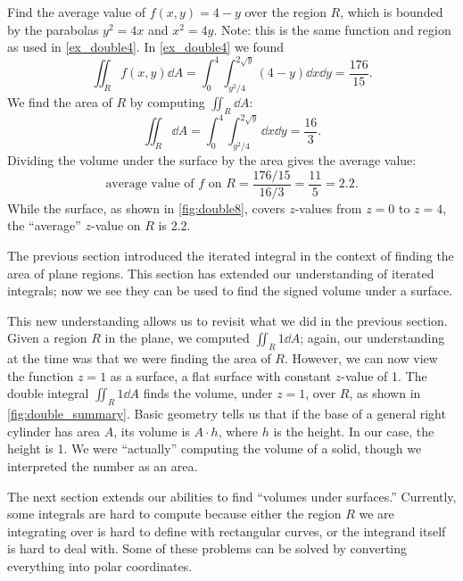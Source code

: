 \begin{example}\label{ex_double8}
Find the average value of $f(x,y) = 4-y$ over the region $R$, which is bounded by the parabolas $y^2=4x$ and $x^2=4y$. Note: this is the same function and region as used in \autoref{ex_double4}.
\solution
In \autoref{ex_double4} we found 
\[\iint_R f(x,y)\dd A = \int_0^4\int_{y^2/4}^{2\sqrt{y}}(4-y)\dd x\dd y = \frac{176}{15}.\] 
We find the area of $R$ by computing $\iint_R \dd A$:
\[\iint_R \dd A = \int_0^4\int_{y^2/4}^{2\sqrt{y}} \dd x\dd y = \frac{16}{3}.\]
%
%
%
Dividing the volume under the surface by the area gives the average value:
\[\text{average value of $f$ on $R$} = \frac{176/15}{16/3} = \frac{11}5 = 2.2.\]
While the surface, as shown in \autoref{fig:double8}, covers $z$-values from $z=0$ to $z=4$, the ``average'' $z$-value on $R$ is 2.2.
\end{example}

The previous section introduced the iterated integral in the context of finding the area of plane regions. This section has extended our understanding of iterated integrals; now we see they can be used to find the signed volume under a surface. 

This new understanding allows us to revisit what we did in the previous section. Given a region $R$ in the plane, we computed $\iint_R 1\dd A$; again, our understanding at the time was that we were finding the area of $R$. However, we can now view the function $z=1$ as a surface, a flat surface with constant $z$-value of 1. The double integral $\iint_R 1\dd A$ finds the volume, under $z=1$, over $R$, as shown in \autoref{fig:double_summary}. Basic geometry tells us that if the base of a general right cylinder has area $A$, its volume is $A\cdot h$, where $h$ is the height. In our case, the height is 1. We were ``actually'' computing the volume of a solid, though we interpreted the number as an area.


The next section extends our abilities to find ``volumes under surfaces.'' Currently, some integrals are hard to compute because either the region $R$ we are integrating over is hard to define with rectangular curves, or the integrand itself is hard to deal with. Some of these problems can be solved by converting everything into polar coordinates.


